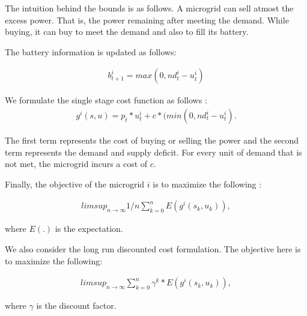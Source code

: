 The intuition behind the bounds is as follows. A microgrid can sell atmost the excess power. That is, the power remaining after meeting the demand. While buying, it can buy to meet the demand and also to fill its battery.

The battery information is updated as follows:

\begin{align}
b_{t+1}^{i} = max(0,nd_{t}^{i} - u_{t}^{i})
\end{align}

We formulate the single stage cost function as follows :
\begin{align}
g^{i}(s,u) = p_{t}*u_{t}^{i} + c*(min(0,nd_{t}^{i} - u_{t}^{i}).
\end{align}

The first term represents the cost of buying or selling the power and the second term represents the demand and supply deficit. For every unit of demand that is not met, the microgrid incurs a cost of $c$. 

Finally, the objective of the microgrid $i$ is to maximize the following \cite{avgcost}:

\begin{align}
limsup_{n \rightarrow \infty} 1/n \sum_{k = 0}^{n} E(g^{i}(s_{k},u_{k})),
\end{align}

where $E(.)$ is the expectation. 

We also consider the long run discounted cost formulation. The objective here is to maximize the following:

\begin{align}
limsup_{n \rightarrow \infty} \sum_{k = 0}^{n} \gamma^{k} * E(g^{i}(s_{k},u_{k})),
\end{align}

where $\gamma$ is the discount factor. 